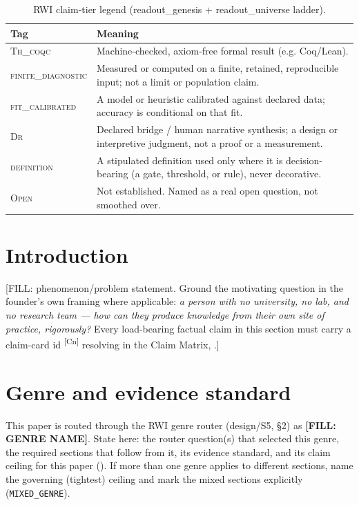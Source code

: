 \documentclass[10pt,twocolumn]{article}
\newcommand{\ThCoqc}{\textsc{Th\_coqc}}
\newcommand{\FiniteDiag}{\textsc{finite\_diagnostic}}
\newcommand{\FitCal}{\textsc{fit\_calibrated}}
\newcommand{\DrTier}{\textsc{Dr}}
\newcommand{\DefTier}{\textsc{definition}}
\newcommand{\OpenTier}{\textsc{Open}}
\newcommand{\claimref}[1]{\textsuperscript{[#1]}}
\begin{document}
\begin{table}[t]
\centering
\small
\begin{tabularx}{\linewidth}{@{}l X@{}}
\toprule
\textbf{Tag} & \textbf{Meaning} \\
\midrule
\ThCoqc{} & Machine-checked, axiom-free formal result (e.g. Coq/Lean). \\
\FiniteDiag{} & Measured or computed on a finite, retained, reproducible input; not a limit or population claim. \\
\FitCal{} & A model or heuristic calibrated against declared data; accuracy is conditional on that fit. \\
\DrTier{} & Declared bridge / human narrative synthesis; a design or interpretive judgment, not a proof or a measurement. \\
\DefTier{} & A stipulated definition used only where it is decision-bearing (a gate, threshold, or rule), never decorative. \\
\OpenTier{} & Not established. Named as a real open question, not smoothed over. \\
\bottomrule
\end{tabularx}
\caption{RWI claim-tier legend (readout\_genesis + readout\_universe ladder).}
\label{tab:tiers}
\end{table}

\section{Introduction}
\label{sec:intro}
[FILL: phenomenon/problem statement. Ground the motivating question in the
founder's own framing where applicable: \emph{a person with no university, no
lab, and no research team --- how can they produce knowledge from their own
site of practice, rigorously?} Every load-bearing factual claim in this
section must carry a claim-card id \claimref{Cn} resolving in the Claim
Matrix, .]

\section{Genre and evidence standard}
\label{sec:genre}
This paper is routed through the RWI genre router (design/S5, \S2) as
\textbf{[FILL: GENRE NAME]}. State here: the router question(s) that selected
this genre, the required sections that follow from it, its evidence standard,
and its claim ceiling for this paper (). If more than one
genre applies to different sections, name the governing (tightest) ceiling
and mark the mixed sections explicitly (\texttt{MIXED\_GENRE}).
\end{document}
